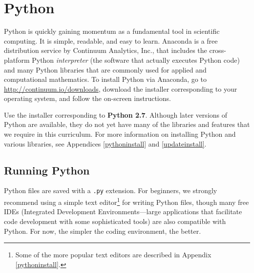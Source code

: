 \label{lab:Essential_Python}


\section*{Python} %

Python is quickly gaining momentum as a fundamental tool in scientific computing.
It is simple, readable, and easy to learn.
Anaconda is a free distribution service by Continuum Analytics, Inc., that includes the cross-platform Python \emph{interpreter} (the software that actually executes Python code) and many Python libraries that are commonly used for applied and computational mathematics.
To install Python via Anaconda, go to \url{http://continuum.io/downloads}, download the installer corresponding to your operating system, and follow the on-screen instructions. 

Use the installer corresponding to \textbf{Python 2.7}.
Although later versions of Python are available, they do not yet have many of the libraries and features that we require in this curriculum.
For more information on installing Python and various libraries, see Appendices \ref{pythoninstall} and \ref{updateinstall}.

\subsection*{Running Python} %

Python files are saved with a \texttt{.py} extension.
For beginners, we strongly recommend using a simple text editor\footnote{Some of the more popular text editors are described in Appendix \ref{pythoninstall}.} for writing Python files, though many free IDEs (Integrated Development Environments---large applications that facilitate code development with some sophisticated tools) are also compatible with Python.
For now, the simpler the coding environment, the better.

